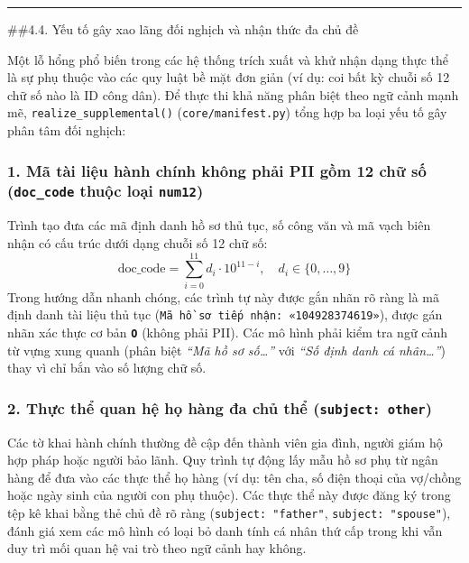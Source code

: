 \documentclass[
  11pt,
  a4paper,
]{article}
\begin{document}
\begin{center}\rule{0.5\linewidth}{0.5pt}\end{center}

\#\#4.4. Yếu tố gây xao lãng đối nghịch và nhận thức đa chủ đề

Một lỗ hổng phổ biến trong các hệ thống trích xuất và khử nhận dạng thực
thể là sự phụ thuộc vào các quy luật bề mặt đơn giản (ví dụ: coi bất kỳ
chuỗi số 12 chữ số nào là ID công dân). Để thực thi khả năng phân biệt
theo ngữ cảnh mạnh mẽ, \texttt{realize\_supplemental()}
(\texttt{core/manifest.py}) tổng hợp ba loại yếu tố gây phân tâm đối
nghịch:

\subsubsection{\texorpdfstring{1. Mã tài liệu hành chính không phải PII
gồm 12 chữ số (\texttt{doc\_code} thuộc loại
\texttt{num12})}{1. Mã tài liệu hành chính không phải PII gồm 12 chữ số (doc\_code thuộc loại num12)}}\label{muxe3-tuxe0i-liux1ec7u-huxe0nh-chuxednh-khuxf4ng-phux1ea3i-pii-gux1ed3m-12-chux1eef-sux1ed1-doc_code-thuux1ed9c-loux1ea1i-num12}

Trình tạo đưa các mã định danh hồ sơ thủ tục, số công văn và mã vạch
biên nhận có cấu trúc dưới dạng chuỗi số 12 chữ số:
\[\text{doc\_code} = \sum_{i=0}^{11} d_i \cdot 10^{11-i}, \quad d_i \in \{0, \dots, 9\}\]
Trong hướng dẫn nhanh chóng, các trình tự này được gắn nhãn rõ ràng là
mã định danh tài liệu thủ tục
(\texttt{Mã\ hồ\ sơ\ tiếp\ nhận:\ «104928374619»}), được gán nhãn xác
thực cơ bản \textbf{\texttt{O}} (không phải PII). Các mô hình phải kiểm
tra ngữ cảnh từ vựng xung quanh (phân biệt \emph{``Mã hồ sơ
số\ldots{}''} với \emph{``Số định danh cá nhân\ldots{}''}) thay vì chỉ
bắn vào số lượng chữ số.

\subsubsection{\texorpdfstring{2. Thực thể quan hệ họ hàng đa chủ thể
(\texttt{subject:\ other})}{2. Thực thể quan hệ họ hàng đa chủ thể (subject: other)}}\label{thux1ef1c-thux1ec3-quan-hux1ec7-hux1ecd-huxe0ng-ux111a-chux1ee7-thux1ec3-subject-other}

Các tờ khai hành chính thường đề cập đến thành viên gia đình, người giám
hộ hợp pháp hoặc người bảo lãnh. Quy trình tự động lấy mẫu hồ sơ phụ từ
ngân hàng để đưa vào các thực thể họ hàng (ví dụ: tên cha, số điện thoại
của vợ/chồng hoặc ngày sinh của người con phụ thuộc). Các thực thể này
được đăng ký trong tệp kê khai bằng thẻ chủ đề rõ ràng
(\texttt{subject:\ "father"}, \texttt{subject:\ "spouse"}), đánh giá xem
các mô hình có loại bỏ danh tính cá nhân thứ cấp trong khi vẫn duy trì
mối quan hệ vai trò theo ngữ cảnh hay không.
\end{document}
